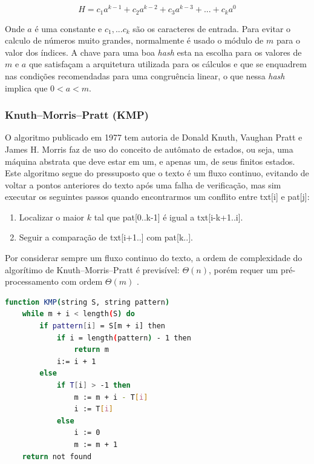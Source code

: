 \begin{equation}
	H=c_1a^{k-1}+ c_2a^{k-2} + c_3a^{k-3} + ... + c_ka^{0}
\end{equation}

Onde $a$ é uma constante e $c_1,...c_k$ são os caracteres de entrada. Para evitar o calculo de números muito grandes, normalmente é usado o módulo de $m$ para o valor dos índices. A chave para uma boa \textit{hash} esta na escolha para os valores de $m$ e $a$ que satisfaçam a arquitetura utilizada para os cálculos e que se enquadrem nas condições recomendadas para uma congruência linear\cite{knuth1998art}, o que nessa \textit{hash} implica que $0<a<m$.


\subsubsection*{Knuth–Morris–Pratt (KMP)} %
\label{ssub:knuth_morris_pratt_}

O algoritmo publicado em 1977 tem autoria de  Donald Knuth, Vaughan Pratt e James H. Morris faz de uso do conceito de autômato de estados, ou seja, uma máquina abstrata que deve estar em um, e apenas um, de seus finitos estados\cite{thierbach1985finite}. Este algoritmo segue do pressuposto que o texto é um fluxo continuo\cite{paulo2015algoritmos}, evitando de voltar a pontos anteriores do texto após uma falha de verificação, mas sim executar os seguintes passos quando encontrarmos um conflito entre {\code txt[i]} e {\code pat[j]}:

\begin{enumerate}
	\item Localizar o maior $k$ tal que {\code pat[0..k-1]} é igual a {\code txt[i-k+1..i]}.
	\item Seguir a comparação de {\code txt[i+1..]} com {\code pat[k..]}.
\end{enumerate}

Por considerar sempre um fluxo continuo do texto, a ordem de complexidade do algorítimo de Knuth–Morris–Pratt é previsível: $\Theta(n)$, porém requer um pré-processamento com ordem $\Theta(m)$ \cite{hume1991fast}.

\begin{lstlisting}[language=Bash,label=kmpalgoritm,caption={Knuth–Morris–Pratt (KMP)}]
function KMP(string S, string pattern)
	while m + i < length(S) do
	    if pattern[i] = S[m + i] then
	        if i = length(pattern) - 1 then
	            return m
	        i:= i + 1
	    else
	        if T[i] > -1 then
	            m := m + i - T[i]
	            i := T[i]
	        else
	            i := 0
	            m := m + 1
	return not found
\end{lstlisting}

